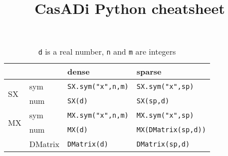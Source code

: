 \documentclass[a4paper,8pt]{article}
\begin{document}
\title{CasADi Python cheatsheet}
\date{}
\maketitle

\begin{table}[ht]
\centering
\begin{tabular}{ll|ll}
 & & dense & sparse \\
\hline
\multirow{2}{*}{SX} & sym & \verb|SX.sym("x",n,m)|  & \verb|SX.sym("x",sp)| \\ 
    & num & \verb|SX(d)|   & \verb|SX(sp,d)| \\
\hline
\multirow{2}{*}{MX} & sym &  \verb|MX.sym("x",n,m)|  & \verb|MX.sym("x",sp)|\\
    & num & \verb|MX(d)| &  \verb|MX(DMatrix(sp,d))| \\
\hline
    & DMatrix &  \verb|DMatrix(d)|  & \verb|DMatrix(sp,d)| \\
\end{tabular}

\caption{\texttt{d} is a real number, \texttt{n} and \texttt{m} are integers }
\label{tab:constr}
\end{table}
\end{document}
